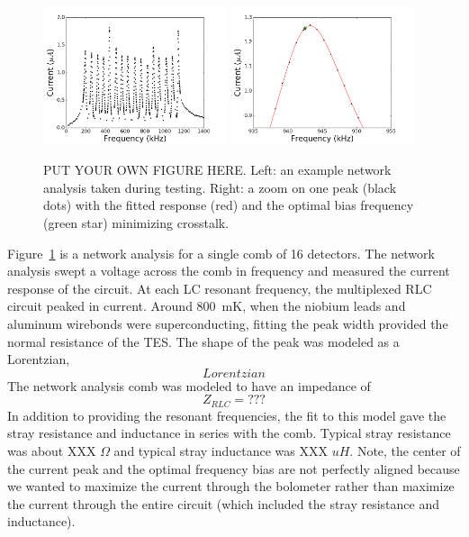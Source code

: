 \begin{figure}[htbp]
\begin{center}
\includegraphics[width=0.48\textwidth]{figures/netanal_b16_SqCh1_5K_20111005_all.png}
\includegraphics[width=0.48\textwidth]{figures/netanal_zoom_b16_SqCh1_5K_20111005.png}
\caption{PUT YOUR OWN FIGURE HERE. Left: an example network analysis taken during testing.
Right: a zoom on one peak (black dots) with the fitted response (red) and the optimal bias frequency (green star) minimizing crosstalk.}
\label{fig:network_analysis}
\end{center}
\end{figure}

Figure~\ref{fig:network_analysis} is a network analysis for a single comb of 16 detectors. 
The network analysis swept a voltage across the comb in frequency and measured the current response of the circuit. 
At each LC resonant frequency, the multiplexed RLC circuit peaked in current. 
Around 800~mK, when the niobium leads and aluminum wirebonds were superconducting, fitting the peak width provided the normal resistance of the \ac{TES}. 
The shape of the peak was modeled as a Lorentzian, 
\begin{equation}
Lorentzian
\end{equation}
The network analysis comb was modeled to have an impedance of 
\begin{equation}
Z_{RLC} = ???
\end{equation}
In addition to providing the resonant frequencies, the fit to this model gave the stray resistance and inductance in series with the comb. 
Typical stray resistance was about XXX $\Omega$ and typical stray inductance was XXX $uH$.
Note, the center of the current peak and the optimal frequency bias are not perfectly aligned because we wanted to maximize the current through the bolometer rather than maximize the current through the entire circuit (which included the stray resistance and inductance).

